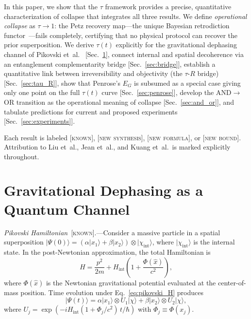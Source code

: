 \documentclass[prl,twocolumn,superscriptaddress,longbibliography,floatfix]{revtex4-2}
\newcommand{\ket}[1]{|#1\rangle}
\newcommand{\tauasym}{\tau}
\begin{document}
In this paper, we show that the $\tauasym$ framework provides a
precise, quantitative characterization of collapse that integrates
all three results.  We define \emph{operational collapse}
as $\tauasym \to 1$: the Petz recovery map---the unique Bayesian
retrodiction functor~\cite{Parzygnat2023}---fails completely,
certifying that no physical protocol can recover the prior
superposition.  We derive $\tauasym(t)$ explicitly for the
gravitational dephasing channel of Pikovski et~al.~\cite{Pikovski2015}
[Sec.~\ref{sec:channel}], connect internal and spatial decoherence
via an entanglement complementarity bridge [Sec.~\ref{sec:bridge}],
establish a quantitative link between irreversibility and objectivity
(the $\tauasym$-$R$ bridge) [Sec.~\ref{sec:tau_R}], show that
Penrose's $E_G$ is subsumed as a special case giving only one point
on the full $\tauasym(t)$ curve [Sec.~\ref{sec:penrose}],
develop the AND$\to$OR transition as the operational meaning of
collapse [Sec.~\ref{sec:and_or}], and tabulate predictions for
current and proposed experiments [Sec.~\ref{sec:experiments}].

Each result is labeled [\textsc{known}], [\textsc{new synthesis}],
[\textsc{new formula}], or [\textsc{new bound}].  Attribution to Liu et~al., Jean et~al., and
Kuang et~al.\ is marked explicitly throughout.

\section{Gravitational Dephasing as a Quantum Channel}
\label{sec:channel}

\emph{Pikovski Hamiltonian}~[\textsc{known}].---Consider a massive
particle in a spatial superposition
$\ket{\Psi(0)} = (\alpha\ket{x_1} + \beta\ket{x_2}) \otimes
\ket{\chi_{\mathrm{int}}}$, where $\ket{\chi_{\mathrm{int}}}$ is the
internal state.  In the post-Newtonian approximation, the total
Hamiltonian is~\cite{Pikovski2015}
\begin{equation}
H = \frac{p^2}{2m} + H_{\mathrm{int}}
  \!\left(1 + \frac{\Phi(\hat{x})}{c^2}\right),
\label{eq:pikovski_H}
\end{equation}
where $\Phi(\hat{x})$ is the Newtonian gravitational potential
evaluated at the center-of-mass position.  Time evolution under
Eq.~\eqref{eq:pikovski_H} produces~\cite{Pikovski2015}
\begin{equation}
\ket{\Psi(t)} = \alpha\ket{x_1}\otimes U_1\ket{\chi}
  + \beta\ket{x_2}\otimes U_2\ket{\chi},
\label{eq:psi_t}
\end{equation}
where $U_j = \exp(-i H_{\mathrm{int}}(1 + \Phi_j/c^2)\,t/\hbar)$
with $\Phi_j \equiv \Phi(x_j)$.
\end{document}
